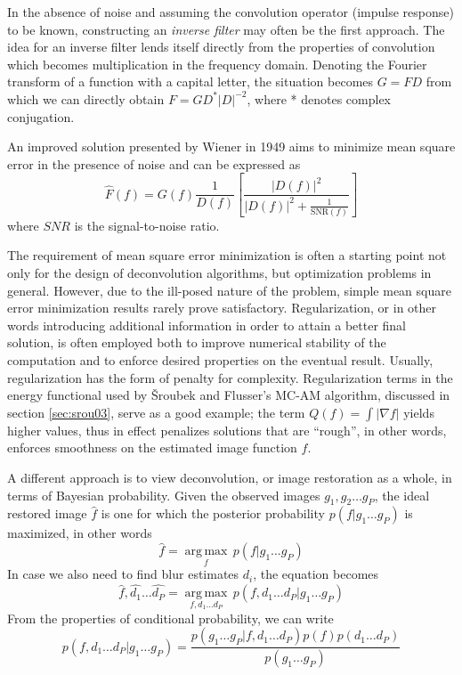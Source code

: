 \documentclass[12pt,notitlepage]{report}
\begin{document}
In the absence of noise and assuming the convolution operator (impulse response) to be known, constructing an {\em inverse filter} may often be the first approach. The idea for an inverse filter lends itself directly from the properties of convolution which becomes multiplication in the frequency domain. Denoting the Fourier transform of a function with a capital letter, the situation becomes $G = FD$ from which we can directly obtain $F = GD^{*}|D|^{-2}$, where * denotes complex conjugation. 

An improved solution presented by Wiener in 1949 aims to minimize mean square error in the presence of noise and can be expressed as 
\begin{equation}
	\label{eq:wiener_deconvolution}
		\hat{F}(f) = G(f) \frac{1}{D(f)} \left[ \frac{ |D(f)|^2 }{ |D(f)|^2 + \frac{1}{\mathrm{SNR}(f)}} \right]
\end{equation}
where $SNR$ is the signal-to-noise ratio. 

The requirement of mean square error minimization is often a starting point not only for the design of deconvolution algorithms, but optimization problems in general. However, due to the ill-posed nature of the problem, simple mean square error minimization results rarely prove satisfactory. Regularization, or in other words introducing additional information in order to attain a better final solution, is often employed both to improve numerical stability of the computation and to enforce desired properties on the eventual result. Usually, regularization has the form of penalty for complexity. Regularization terms in the energy functional used by Šroubek and Flusser's MC-AM algorithm, discussed in section \ref{sec:srou03}, serve as a good example; the term $Q(f) = \int |\nabla f|$ yields higher values, thus in effect penalizes solutions that are ``rough'', in other words, enforces smoothness on the estimated image function $f$.        	 

A different approach is to view deconvolution, or image restoration as a whole, in terms of Bayesian probability. Given the observed images $g_1, g_2 \dots g_P$, the ideal restored image $\hat{f}$ is one for which the posterior probability $p(f|g_1 \dots g_P)$ is maximized, in other words 
\begin{equation}
	\label{eq:posterior_prob}
		\hat{f} = \underset{f}{\operatorname{arg\,max}} \, p(f|g_1 \dots g_P)
\end{equation}
In case we also need to find blur estimates $d_i$, the equation becomes 
\begin{equation}
	\label{eq:posterior_prob_ext}
		\hat{f},\hat{d_1} \dots \hat{d_P} = \underset{f,d_1 \dots d_P}{\operatorname{arg\,max}} \, p(f,d_1 \dots d_P |g_1 \dots g_P)
\end{equation}
From the properties of conditional probability, we can write 
\begin{equation}
	\label{eq:posterior_prob_prop}
		 p(f,d_1 \dots d_P |g_1 \dots g_P) = \frac{p(g_1 \dots g_P|f,d_1 \dots d_P)p(f)p(d_1 \dots d_P)}{p(g_1 \dots g_P)}
\end{equation}
\end{document}
